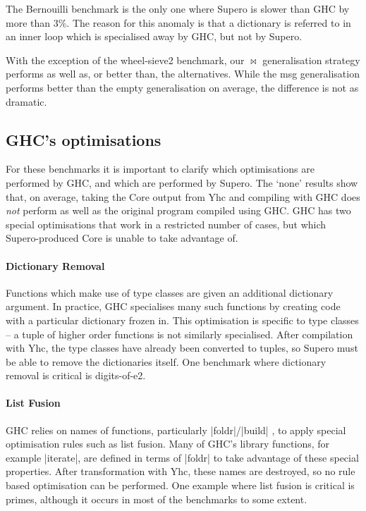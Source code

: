The Bernouilli benchmark is the only one where Supero is slower than GHC by more than 3\%. The reason for this anomaly is that a dictionary is referred to in an inner loop which is specialised away by GHC, but not by Supero.

With the exception of the wheel-sieve2 benchmark, our $\bowtie$ generalisation strategy performs as well as, or better than, the alternatives. While the msg generalisation performs better than the empty generalisation on average, the difference is not as dramatic.

\subsection{GHC's optimisations}

For these benchmarks it is important to clarify which optimisations are performed by GHC, and which are performed by Supero. The `none' results show that, on average, taking the Core output from Yhc and compiling with GHC does \textit{not} perform as well as the original program compiled using GHC. GHC has two special optimisations that work in a restricted number of cases, but which Supero-produced Core is unable to take advantage of.

\paragraph{Dictionary Removal} Functions which make use of type classes are given an additional dictionary argument. In practice, GHC specialises many such functions by creating code with a particular dictionary frozen in. This optimisation is specific to type classes -- a tuple of higher order functions is not similarly specialised. After compilation with Yhc, the type classes have already been converted to tuples, so Supero must be able to remove the dictionaries itself. One benchmark where dictionary removal is critical is digits-of-e2.

\paragraph{List Fusion} GHC relies on names of functions, particularly |foldr|/|build| \cite{spj:rules}, to apply special optimisation rules such as list fusion. Many of GHC's library functions, for example |iterate|, are defined in terms of |foldr| to take advantage of these special properties. After transformation with Yhc, these names are destroyed, so no rule based optimisation can be performed. One example where list fusion is critical is primes, although it occurs in most of the benchmarks to some extent.

